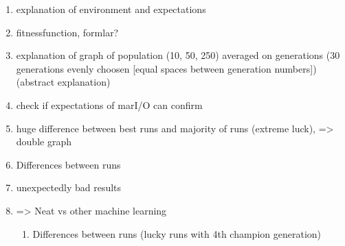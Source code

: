 		\begin{enumerate}
			\item explanation of environment and expectations
			\item fitnessfunction, formlar?
			\item explanation of graph of population (10, 50, 250) averaged on generations (30 generations evenly choosen [equal spaces between generation numbers])  (abstract explanation)
			\item check if expectations of marI/O can confirm
			\item huge difference between best runs and majority of runs (extreme luck), => double graph
			\item Differences between runs 
			\item unexpectedly bad results
			\item => Neat vs other machine learning
			\begin{enumerate}
				\item Differences between runs (lucky runs with 4th champion generation)
			\end{enumerate}
		\end{enumerate}
		
